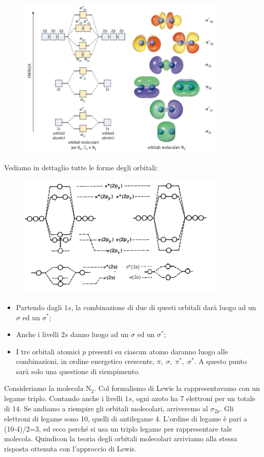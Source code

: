 \begin{figure}[htp]
    \centering
    \includegraphics[width=10cm]{immagini/livelli_B2_C2_N2.png}
\end{figure}

Vediamo in dettaglio tutte le forme degli orbitali:

\begin{figure}[htp]
    \centering
    \includegraphics[width=10cm]{immagini/sequenza_energetica_BCN.png}
\end{figure}

\begin{itemize}
    \item Partendo dagli $1s$, la combinazione di due di questi orbitali darà luogo ad un $\sigma$ ed un $\sigma^*$;
    \item Anche i livelli $2s$ danno luogo ad un $\sigma$ ed un $\sigma^*$;
    \item I tre orbitali atomici $p$ presenti su ciascun atomo daranno luogo alle combinazioni, in ordine energetico crescente, $\pi,\; \sigma, \; \pi^*, \; \sigma^*$. A questo punto sarà solo una questione di riempimento.
\end{itemize}

Consideriamo la molecola N$_2$. Col formalismo di Lewis la rappresentavamo con un legame triplo. Contando anche i livelli $1s$, ogni azoto ha 7 elettroni per un totale di 14. Se andiamo a riempire gli orbitali molecolari, arriveremo al $\sigma_{2p}$. Gli elettroni di legame sono 10, quelli di antilegame 4. L'ordine di legame è pari a (10-4)/2=3, ed ecco perché si usa un triplo legame per rappresentare tale molecola. Quindicon la teoria degli orbitali molecolari arriviamo alla stessa risposta ottenuta con l'approccio di Lewis.

